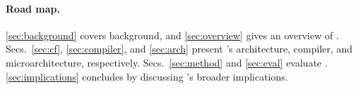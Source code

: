 \paragraph{Road map.}
%
\autoref{sec:background} covers background, and
\autoref{sec:overview} gives an overview of \riptide.
%
Secs.~\ref{sec:cf}, \ref{sec:compiler}, and \ref{sec:arch} present
\riptide's architecture, compiler, and microarchitecture, respectively.
%
Secs.~\ref{sec:method} and \ref{sec:eval} evaluate \riptide.
\autoref{sec:implications} concludes by discussing \riptide's broader implications.
